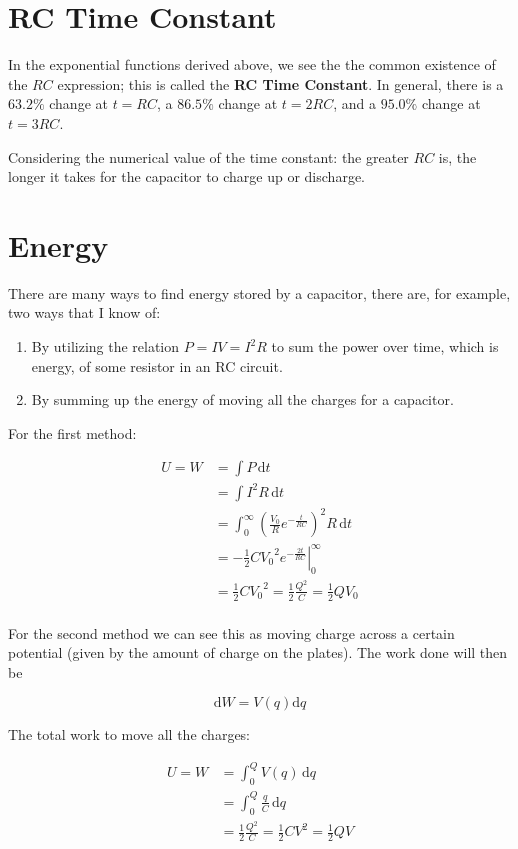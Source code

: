 \section{RC Time Constant}

In the exponential functions derived above, we see the the common existence of the $RC$ expression; this is called the \textbf{RC Time Constant}. In general, there is a $63.2\%$ change at $t = RC$, a $86.5\%$ change at $t = 2RC$, and a $95.0\%$ change at $t = 3RC$.

Considering the numerical value of the time constant: the greater $RC$ is, the longer it takes for the capacitor to charge up or discharge.

\section{Energy}

There are many ways to find energy stored by a capacitor, there are, for example, two ways that I know of:
\begin{enumerate}[1.]
    \item By utilizing the relation $P = IV = I^2R$ to sum the power over time, which is energy, of some resistor in an RC circuit.
    \item By summing up the energy of moving all the charges for a capacitor.
\end{enumerate}

For the first method:

\begin{align*}
    U = W &= \int P \,\mathrm{d}t\\
    &= \int I^2R \,\mathrm{d}t\\
    &= \int_0^\infty \left(\frac{V_0}{R} e^{-\frac{t}{RC}}\right)^2 R \,\mathrm{d}t\\
    &= \left.-\frac{1}{2} C{V_0}^2 e^{-\frac{2t}{RC}}\right\vert_0^\infty\\
    &= \boxed{\frac{1}{2} C{V_0}^2 = \frac{1}{2} \frac{Q^2}{C} = \frac{1}{2}QV_0}\\
\end{align*}

For the second method we can see this as moving charge across a certain potential (given by the amount of charge on the plates). The work done will then be

\[\mathrm{d}W = V(q) \mathrm{d}q\]

The total work to move all the charges:

\begin{align*}
    U  = W &= \int_0^Q V(q) \,\mathrm{d}q\\
    &= \int_0^Q \frac{q}{C} \,\mathrm{d}q\\
    &= \boxed{\frac{1}{2} \frac{Q^2}{C} = \frac{1}{2}CV^2 = \frac{1}{2}QV}
\end{align*}

